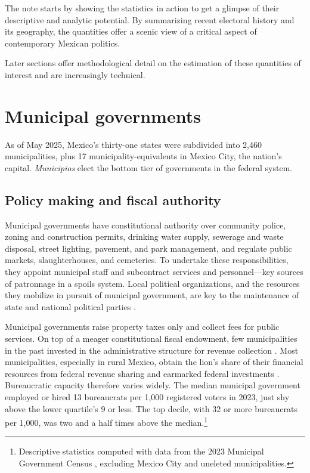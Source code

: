 \documentclass[letter,12pt]{article}
\begin{document}
The note starts by showing the statistics in action to get a glimpse of their descriptive and analytic potential. By summarizing recent electoral history and its geography, the quantities offer a scenic view of a critical aspect of contemporary Mexican politics. 

Later sections offer methodological detail on the estimation of these quantities of interest and are increasingly technical. 

\section{Municipal governments}
As of May 2025, Mexico's thirty-one states were subdivided into 2,460 municipalities, plus 17 municipality-equivalents in Mexico City, the nation's capital. \emph{Municipios} elect the bottom tier of governments in the federal system.
\subsection{Policy making and fiscal authority}
Municipal governments have constitutional authority over community police, zoning and construction permits, drinking water supply, sewerage and waste disposal, street lighting, pavement, and park management, and regulate public markets, slaughterhouses, and cemeteries. To undertake these responsibilities, they appoint municipal staff and subcontract services and personnel---key sources of patronnage in a spoils system. Local political organizations, and the resources they mobilize in pursuit of municipal government, are key to the maintenance of state and national political parties \citep{coppedge.MxVen.1993, key.1964, rosas.lucardi.Brokers.2019}. 

Municipal governments raise property taxes only and collect fees for public services. On top of a meager constitutional fiscal endowment, few municipalities in the past invested in the administrative structure for revenue collection \citep{garfias.state.cap.2018}. Most municipalities, especially in rural Mexico, obtain the lion's share of their financial resources from federal revenue sharing and earmarked federal investments \citep{diaz.cayeros.2006, figueroa-mansur-itam.2024}. Bureaucratic capacity therefore varies widely. The median municipal government employed or hired 13 bureaucrats per 1,000 registered voters in 2023, just shy above the lower quartile's 9 or less. The top decile, with 32 or more bureaucrats per 1,000, was two and a half times above the median.\footnote{Descriptive statistics computed with data from the 2023 Municipal Government Census \citep{inegi.CensoGobMun2023}, excluding Mexico City and uneleted municipalities.}
\end{document}
